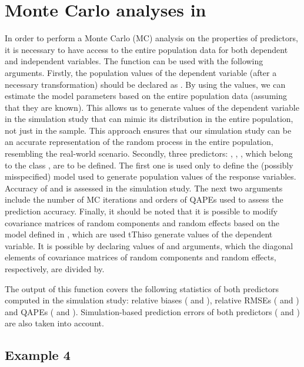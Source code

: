 \section{Monte Carlo analyses in }

In order to perform a Monte Carlo (MC) analysis on the properties of predictors, it is necessary to have access to the entire population data for both dependent and independent variables. The function  can be used with the following arguments. Firstly, the population values of the dependent variable (after a necessary transformation) should be declared as . By using the  values, we can estimate the model parameters based on the entire population data (assuming that they are known). This allows us to generate values of the dependent variable in the simulation study that can mimic its distribution in the entire population, not just in the sample. This approach ensures that our simulation study can be an accurate representation of the random process in the entire population, resembling the real-world scenario. Secondly, three predictors: , , , which belong to the class , are to be defined. The first one is used only to define the (possibly misspecified) model used to generate population values of the response variables. Accuracy of  and  is assessed in the simulation study. The next two arguments include the number of MC iterations  and orders  of QAPEs used to assess the prediction accuracy. Finally, it should be noted that it is possible to modify covariance matrices of random components and random effects based on the model defined in , which are used tThiso generate values of the dependent variable. It is possible by declaring values of  and  arguments, which the diagonal elements of covariance matrices of random components and random effects, respectively, are divided by.

The output of this function covers the following statistics of both predictors computed in the simulation study: relative biases ( and ), relative RMSEs ( and ) and QAPEs ( and ). Simulation-based prediction errors of both predictors ( and ) are also taken into account.

\subsection{Example 4}

